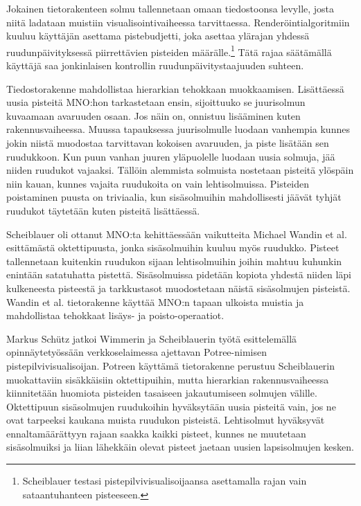 Jokainen tietorakenteen solmu tallennetaan omaan tiedostoonsa levylle, josta niitä ladataan muistiin visualisointivaiheessa tarvittaessa. Renderöintialgoritmiin kuuluu käyttäjän asettama pistebudjetti, joka asettaa ylärajan yhdessä ruudunpäivityksessä piirrettävien pisteiden määrälle.\footnote{Scheiblauer testasi pistepilvivisualisoijaansa asettamalla rajan vain sataantuhanteen pisteeseen.} Tätä rajaa säätämällä käyttäjä saa jonkinlaisen kontrollin ruudunpäivitystaajuuden suhteen. \cite{scheiblauer}

Tiedostorakenne mahdollistaa hierarkian tehokkaan muokkaamisen. Lisättäessä uusia pisteitä MNO:hon tarkastetaan ensin, sijoittuuko se juurisolmun kuvaamaan avaruuden osaan. Jos näin on, onnistuu lisääminen kuten rakennusvaiheessa. Muussa tapauksessa juurisolmulle luodaan vanhempia kunnes jokin niistä muodostaa tarvittavan kokoisen avaruuden, ja piste lisätään sen ruudukkoon. Kun puun vanhan juuren yläpuolelle luodaan uusia solmuja, jää niiden ruudukot vajaaksi. Tällöin alemmista solmuista nostetaan pisteitä ylöspäin niin kauan, kunnes vajaita ruudukoita on vain lehtisolmuissa. Pisteiden poistaminen puusta on triviaalia, kun sisäsolmuihin mahdollisesti jäävät tyhjät ruudukot täytetään kuten pisteitä lisättäessä. \cite{scheiblauer}

Scheiblauer oli ottanut MNO:ta kehittäessään vaikutteita Michael Wandin et al. esittämästä oktettipuusta, jonka sisäsolmuihin kuuluu myös ruudukko. Pisteet tallennetaan kuitenkin ruudukon sijaan lehtisolmuihin joihin mahtuu kuhunkin enintään satatuhatta pistettä. Sisäsolmuissa pidetään kopiota yhdestä niiden läpi kulkeneesta pisteestä ja tarkkustasot muodostetaan näistä sisäsolmujen pisteistä. Wandin et al. tietorakenne käyttää MNO:n tapaan ulkoista muistia ja mahdollistaa tehokkaat lisäys- ja poisto-operaatiot. \cite{wand}

Markus Schütz jatkoi Wimmerin ja Scheiblauerin työtä esittelemällä opinnäytetyössään verkkoselaimessa ajettavan Potree-nimisen pistepilvivisualisoijan. Potreen käyttämä tietorakenne perustuu Scheiblauerin muokattaviin sisäkkäisiin oktettipuihin, mutta hierarkian rakennusvaiheessa kiinnitetään huomiota pisteiden tasaiseen jakautumiseen solmujen välille. Oktettipuun sisäsolmujen ruudukoihin hyväksytään uusia pisteitä vain, jos ne ovat tarpeeksi kaukana muista ruudukon pisteistä. Lehtisolmut hyväksyvät ennaltamäärättyyn rajaan saakka kaikki pisteet, kunnes ne muutetaan sisäsolmuiksi ja liian lähekkäin olevat pisteet jaetaan uusien lapsisolmujen kesken. \cite{potree}

